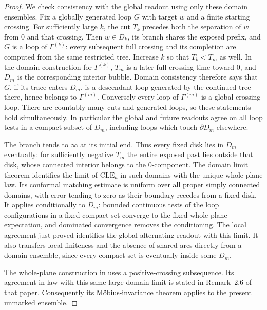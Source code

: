 \documentclass[11pt]{article}
\numberwithin{equation}{section}
\theoremstyle{definition}
\theoremstyle{remark}
\newcommand{\1}{\mathbf 1}
\begin{document}
\begin{proof}
We check consistency with the global readout using only these domain
ensembles.  Fix a globally generated loop $G$ with target $w$ and a
finite starting crossing.  For sufficiently large $k$, the cut $T_k$
precedes both the separation of $w$ from $0$ and that crossing.  Then
$w\in D_k$, its branch shares the exposed prefix, and $G$ is a loop
of $\Gamma^{(k)}$: every subsequent full crossing and its completion
are computed from the same restricted tree.  Increase $k$ so that
$T_k<T_m$ as well.  In the domain construction for $\Gamma^{(k)}$,
$T_m$ is a later full-crossing time toward $0$, and $D_m$ is the
corresponding interior bubble.  Domain consistency therefore says
that $G$, if its trace enters $D_m$, is a descendant loop generated by
the continued tree there, hence belongs to $\Gamma^{(m)}$.
Conversely every loop of $\Gamma^{(m)}$ is a global crossing loop.
There are countably many cuts and generated loops, so these statements
hold simultaneously.  In particular the global and future readouts
agree on all loop tests in a compact subset of $D_m$, including loops
which touch $\partial D_m$ elsewhere.

The branch tends to $\infty$ at its initial end.  Thus every fixed disk
lies in $D_m$ eventually: for sufficiently negative $T_m$ the entire
exposed past lies outside that disk, whose connected interior belongs
to the $0$-component.  The domain limit theorem
\cite[Theorem~A.1]{MillerWatsonWilsonNestingField} identifies the limit
of $\mathrm{CLE}_{\kappa}$ in such domains with the unique whole-plane
law.  Its conformal matching estimate is uniform over all proper simply
connected domains, with error tending to zero as their boundary recedes
from a fixed disk.  It applies conditionally to $D_m$: bounded
continuous tests of the loop configurations in a fixed compact set
converge to the fixed whole-plane expectation, and dominated convergence
removes the conditioning.  The local agreement just proved identifies
the global alternating readout with this limit.  It also transfers
local finiteness and the absence of shared arcs directly from a domain
ensemble, since every compact set is eventually inside some $D_m$.

The whole-plane construction in \cite[Section~2.3.2]{GwynneMillerQianCLE}
uses a positive-crossing subsequence.  Its agreement in law with this
same large-domain limit is stated in Remark~2.6 of that paper.
Consequently its M\"obius-invariance theorem
\cite[Theorem~1.1]{GwynneMillerQianCLE} applies to the present unmarked
ensemble.
\end{proof}
\end{document}
